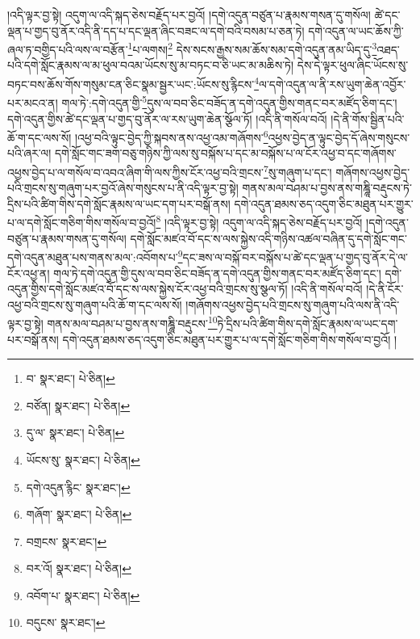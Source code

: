 །འདི་ལྟར་བྱ་སྟེ། འདུག་ལ་འདི་སྐད་ཅེས་བརྗོད་པར་བྱའོ། །དགེ་འདུན་བཙུན་པ་རྣམས་གསན་དུ་གསོལ། ཚེ་དང་ལྡན་པ་གྱད་བུ་ནོར་འདི་ནི་དད་པ་དང་ལྡན་ཞིང་བཟང་ལ་དགེ་བའི་བསམ་པ་ཅན་ཏེ། དགེ་འདུན་ལ་ཡང་ཆོས་ཀྱི་ཞལ་ཏ་བགྱིད་པའི་ལས་ལ་བརྩོན་\footnote{བ་  སྣར་ཐང་།  པེ་ཅིན། }པ་ལགས།\footnote{བཙོན།  སྣར་ཐང་།  པེ་ཅིན། } དེས་སངས་རྒྱས་སམ་ཆོས་སམ་དགེ་འདུན་ནམ་ཡིད་དུ་\footnote{དུ་ལ་  སྣར་ཐང་།  པེ་ཅིན། }འཐད་པའི་དགེ་སློང་རྣམས་ལ་མ་ཕུལ་བའམ་ཡོངས་སུ་མ་བཏང་བ་ཅི་ཡང་མ་མཆིས་ཏེ། དེས་དེ་ལྟར་ཕུལ་ཞིང་ཡོངས་སུ་བཏང་བས་ཆོས་གོས་གསུམ་ངན་ཅིང་སྣམ་སྦྱར་ཡང་:ཡོངས་སུ་རྙིངས་\footnote{ཡོངས་སུ་  སྣར་ཐང་།  པེ་ཅིན། }ལ་དགེ་འདུན་ལ་ནི་རས་ཡུག་ཆེན་འབྱོར་པར་མངའ་ན། གལ་ཏེ་:དགེ་འདུན་གྱི་\footnote{དགེ་འདུན་རྙིང་  སྣར་ཐང་། }དུས་ལ་བབ་ཅིང་བཟོད་ན་དགེ་འདུན་གྱིས་གནང་བར་མཛོད་ཅིག་དང་། དགེ་འདུན་གྱིས་ཚེ་དང་ལྡན་པ་གྱད་བུ་ནོར་ལ་རས་ཡུག་ཆེན་སྩོལ་ཏོ། །འདི་ནི་གསོལ་བའོ། །དེ་ནི་གོས་སྦྱིན་པའི་ཆོ་ག་དང་ལས་སོ། །འཕྱ་བའི་ལྟུང་བྱེད་ཀྱི་སྐབས་ནས་འཕྱ་འམ་གཞོགས་\footnote{གཞོག་  སྣར་ཐང་།  པེ་ཅིན། }འཕྱས་བྱེད་ན་ལྟུང་བྱེད་དོ་ཞེས་གསུངས་པའི་ཞར་ལ། དགེ་སློང་གང་ཟག་བཅུ་གཉིས་ཀྱི་ལས་སུ་བསྐོས་པ་དང་མ་བསྐོས་པ་ལ་ངོར་འཕྱ་བ་དང་གཞོགས་འཕྱས་བྱེད་པ་ལ་གསོལ་བ་འབའ་ཞིག་གི་ལས་ཀྱིས་ངོར་འཕྱ་བའི་གྲངས་\footnote{བགྲངས་  སྣར་ཐང་། }སུ་གཞུག་པ་དང་། གཞོགས་འཕྱས་བྱེད་པའི་གྲངས་སུ་གཞུག་པར་བྱའོ་ཞེས་གསུངས་པ་ནི་འདི་ལྟར་བྱ་སྟེ། གནས་མལ་བཤམ་པ་བྱས་ནས་གཎྜཱི་བརྡུངས་ཏེ་དྲིས་པའི་ཚིག་གིས་དགེ་སློང་རྣམས་ལ་ཡང་དག་པར་བསྒོ་ནས། དགེ་འདུན་ཐམས་ཅད་འདུག་ཅིང་མཐུན་པར་གྱུར་པ་ལ་དགེ་སློང་གཅིག་གིས་གསོལ་བ་བྱའོ།\footnote{བར་འོ།  སྣར་ཐང་།  པེ་ཅིན། } །འདི་ལྟར་བྱ་སྟེ། འདུག་ལ་འདི་སྐད་ཅེས་བརྗོད་པར་བྱའོ། །དགེ་འདུན་བཙུན་པ་རྣམས་གསན་དུ་གསོལ། དགེ་སློང་མཛའ་བོ་དང་ས་ལས་སྐྱེས་འདི་གཉིས་འཚལ་བཞིན་དུ་དགེ་སློང་གང་དགེ་འདུན་མཐུན་པས་གནས་མལ་:འབོགས་པ་\footnote{འབོག་པ་  སྣར་ཐང་།  པེ་ཅིན། }དང་ཟས་ལ་བསྐོ་བར་བསྐོས་པ་ཚེ་དང་ལྡན་པ་གྱད་བུ་ནོར་དེ་ལ་ངོར་འཕྱ་ན། གལ་ཏེ་དགེ་འདུན་གྱི་དུས་ལ་བབ་ཅིང་བཟོད་ན་དགེ་འདུན་གྱིས་གནང་བར་མཛོད་ཅིག་དང་། དགེ་འདུན་གྱིས་དགེ་སློང་མཛའ་བོ་དང་ས་ལས་སྐྱེས་ངོར་འཕྱ་བའི་གྲངས་སུ་སྩལ་ཏོ། །འདི་ནི་གསོལ་བའོ། །དེ་ནི་ངོར་འཕྱ་བའི་གྲངས་སུ་གཞུག་པའི་ཆོ་ག་དང་ལས་སོ། །གཞོགས་འཕྱས་བྱེད་པའི་གྲངས་སུ་གཞུག་པའི་ལས་ནི་འདི་ལྟར་བྱ་སྟེ། གནས་མལ་བཤམ་པ་བྱས་ནས་གཎྜཱི་བརྡུངས་\footnote{བདུངས་  སྣར་ཐང་། }ཏེ་དྲིས་པའི་ཚིག་གིས་དགེ་སློང་རྣམས་ལ་ཡང་དག་པར་བསྒོ་ནས། དགེ་འདུན་ཐམས་ཅད་འདུག་ཅིང་མཐུན་པར་གྱུར་པ་ལ་དགེ་སློང་གཅིག་གིས་གསོལ་བ་བྱའོ། །
